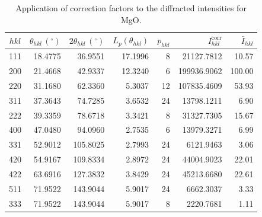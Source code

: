 \begin{table}[h!]
\centering\leavevmode
{\small\begin{tabular}{|crrrrrr|}
\hline
$hkl$ & $\theta_{hkl}\,(^{\circ})$ & $2\theta_{hkl} \,(^{\circ})$ & $L_p(\theta_{hkl})$ & $p_{hkl}$ & $I_{hkl}^{\text{corr}}$ & $\bar{I}_{hkl}$ \\
\hline\hline
111 & 18.4775 & 36.9551 & 17.1996 & 8 & 21127.7812 & 10.57 \\
200 & 21.4668 & 42.9337 & 12.3240 & 6 & 199936.9062 & 100.00 \\
220 & 31.1680 & 62.3360 & 5.3037 & 12 & 107835.4609 & 53.93 \\
311 & 37.3643 & 74.7285 & 3.6532 & 24 & 13798.1211 & 6.90 \\
222 & 39.3359 & 78.6718 & 3.3421 & 8 & 31327.7305 & 15.67 \\
400 & 47.0480 & 94.0960 & 2.7535 & 6 & 13979.3271 & 6.99 \\
331 & 52.9012 & 105.8025 & 2.7993 & 24 & 6121.9463 & 3.06 \\
420 & 54.9167 & 109.8334 & 2.8972 & 24 & 44004.9023 & 22.01 \\
422 & 63.6916 & 127.3832 & 3.8429 & 24 & 45213.6680 & 22.61 \\
511 & 71.9522 & 143.9044 & 5.9017 & 24 & 6662.3037 & 3.33 \\
333 & 71.9522 & 143.9044 & 5.9017 & 8 & 2220.7681 & 1.11 \\
\hline
\end{tabular}}
\caption{\label{\chabbr:tb:CalcMgO2}Application of correction factors to the diffracted intensities for MgO.}
\end{table}


